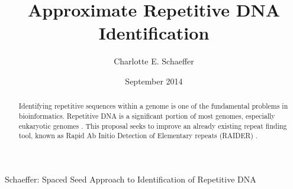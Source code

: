 \title{Approximate Repetitive DNA Identification}
\author{Charlotte E. Schaeffer}
\date{September 2014}
{Schaeffer: Spaced Seed Approach to Identification of Repetitive DNA}
\maketitle

\begin{abstract}
Identifying repetitive sequences within a genome is one of the fundamental problems in bioinformatics. Repetitive DNA is a significant portion of most genomes, especially eukaryotic genomes \cite{pevzner2004de-novo}. This proposal seeks to improve an already existing repeat finding tool, known as Rapid Ab Initio Detection of Elementary repeats (RAIDER) \cite{figueroa2013raiderpaper}. 
\end{abstract}

\tableofcontents
\newpage
